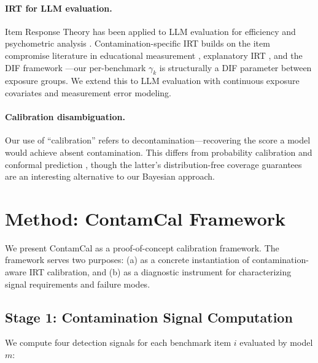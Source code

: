 \documentclass[11pt]{article}
\newcommand{\ours}{ContamCal}
\begin{document}
\paragraph{IRT for LLM evaluation.}
Item Response Theory has been applied to LLM evaluation for efficiency \citep{polo2024tinybenchmarks} and psychometric analysis \citep{lalor2024benchmarking}.
Contamination-specific IRT builds on the item compromise literature in educational measurement \citep{eckerly2017detecting,sinharay2017assessing}, explanatory IRT \citep{deboeck2004explanatory}, and the DIF framework \citep{holland1993differential,thissen1993detection,zumbo1999handbook}---our per-benchmark $\gamma_k$ is structurally a DIF parameter between exposure groups.
We extend this to LLM evaluation with continuous exposure covariates and measurement error modeling.

\paragraph{Calibration disambiguation.}
Our use of ``calibration'' refers to decontamination---recovering the score a model would achieve absent contamination.
This differs from probability calibration \citep{guo2017calibration,platt1999probabilistic} and conformal prediction \citep{angelopoulos2023conformal}, though the latter's distribution-free coverage guarantees are an interesting alternative to our Bayesian approach.


\section{Method: ContamCal Framework}
\label{sec:method}

We present \ours{} as a proof-of-concept calibration framework.
The framework serves two purposes: (a) as a concrete instantiation of contamination-aware IRT calibration, and (b) as a diagnostic instrument for characterizing signal requirements and failure modes.

\subsection{Stage 1: Contamination Signal Computation}

We compute four detection signals for each benchmark item $i$ evaluated by model $m$:
\end{document}
